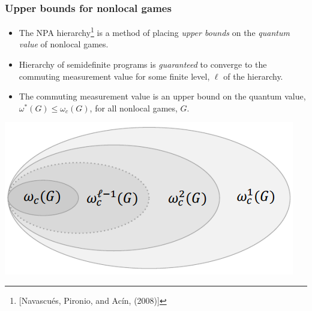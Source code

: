 \documentclass{beamer}
\newcommand{\ip}[2]{\langle #1 , #2\rangle}
\def\H{\mathcal{H}}
\newcommand{\setft}[1]{\mathrm{#1}}
\newcommand{\Density}{\setft{D}}
\newcommand{\Pos}{\setft{Pos}}
\begin{document}
\begin{frame}
	\frametitle{Upper bounds for nonlocal games}
	\begin{itemize}
		\item The NPA hierarchy\footnote{[Navascu\'es, Pironio, and Ac\'in, (2008)]} is a method of placing \emph{upper bounds} on the \emph{quantum value} of nonlocal games. 
		\item Hierarchy of semidefinite programs is \emph{guaranteed} to converge to the commuting measurement value for some finite level, $\ell$ of the hierarchy. 
		\item The commuting measurement value is an upper bound on the quantum value, $\omega^*(G) \leq \omega_c(G)$, for all nonlocal games, $G$. 
	\end{itemize}
	\begin{center}
		\includegraphics[scale=0.5]{figures/CommutingValues}
	\end{center}
\end{frame}

%
\end{document}
